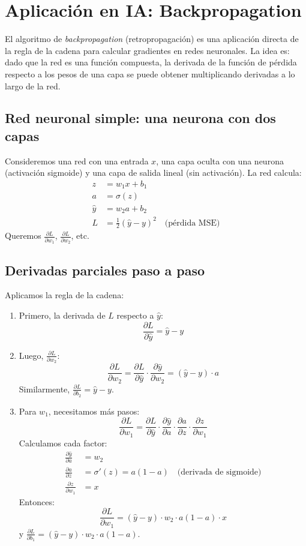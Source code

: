 \documentclass[12pt,a4paper,openany,oneside]{book}
\begin{document}
\section{Aplicación en IA: Backpropagation}

El algoritmo de \textit{backpropagation} (retropropagación) es una aplicación directa de la regla de la cadena para calcular gradientes en redes neuronales. La idea es: dado que la red es una función compuesta, la derivada de la función de pérdida respecto a los pesos de una capa se puede obtener multiplicando derivadas a lo largo de la red.

\subsection{Red neuronal simple: una neurona con dos capas}
Consideremos una red con una entrada $x$, una capa oculta con una neurona (activación sigmoide) y una capa de salida lineal (sin activación). La red calcula:
\begin{align*}
z &= w_1 x + b_1 \\
a &= \sigma(z) \\
\hat{y} &= w_2 a + b_2 \\
L &= \frac{1}{2}(\hat{y} - y)^2 \quad \text{(pérdida MSE)}
\end{align*}
Queremos $\frac{\partial L}{\partial w_1}$, $\frac{\partial L}{\partial w_2}$, etc.

\subsection{Derivadas parciales paso a paso}
Aplicamos la regla de la cadena:

\begin{enumerate}
    \item Primero, la derivada de $L$ respecto a $\hat{y}$:
    \[
    \frac{\partial L}{\partial \hat{y}} = \hat{y} - y
    \]
    \item Luego, $\frac{\partial L}{\partial w_2}$:
    \[
    \frac{\partial L}{\partial w_2} = \frac{\partial L}{\partial \hat{y}} \cdot \frac{\partial \hat{y}}{\partial w_2} = (\hat{y} - y) \cdot a
    \]
    Similarmente, $\frac{\partial L}{\partial b_2} = \hat{y} - y$.
    
    \item Para $w_1$, necesitamos más pasos:
    \[
    \frac{\partial L}{\partial w_1} = \frac{\partial L}{\partial \hat{y}} \cdot \frac{\partial \hat{y}}{\partial a} \cdot \frac{\partial a}{\partial z} \cdot \frac{\partial z}{\partial w_1}
    \]
    Calculamos cada factor:
    \begin{align*}
    \frac{\partial \hat{y}}{\partial a} &= w_2 \\
    \frac{\partial a}{\partial z} &= \sigma'(z) = a(1-a) \quad \text{(derivada de sigmoide)} \\
    \frac{\partial z}{\partial w_1} &= x
    \end{align*}
    Entonces:
    \[
    \frac{\partial L}{\partial w_1} = (\hat{y} - y) \cdot w_2 \cdot a(1-a) \cdot x
    \]
    y $\frac{\partial L}{\partial b_1} = (\hat{y} - y) \cdot w_2 \cdot a(1-a)$.
\end{enumerate}
\end{document}
